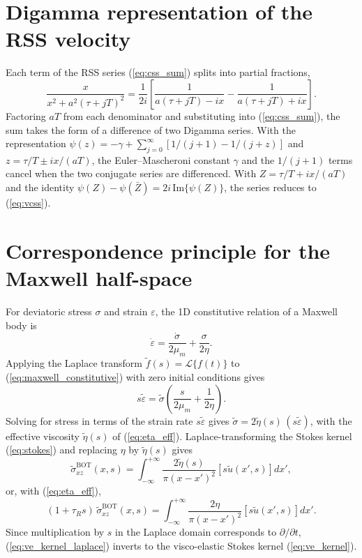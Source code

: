 \documentclass[extra]{gji}
\newcommand{\IM}{\mathrm{Im}}
\begin{document}
\section{Digamma representation of the RSS velocity}
\label{app:digamma}

Each term of the RSS series (\ref{eq:css_sum}) splits into partial
fractions,
\begin{equation*}
\frac{x}{x^2+a^2(\tau+jT)^2}
= \frac{1}{2i}\!\left[
    \frac{1}{a(\tau+jT)-ix} - \frac{1}{a(\tau+jT)+ix}
  \right].
\end{equation*}
Factoring $aT$ from each denominator and substituting into
(\ref{eq:css_sum}), the sum takes the form of a difference of two Digamma
series. With the representation $\psi(z) = -\gamma +
\sum_{j=0}^\infty[1/(j+1) - 1/(j+z)]$ and $z=\tau/T\pm ix/(aT)$, the
Euler--Mascheroni constant $\gamma$ and the $1/(j+1)$ terms cancel when the
two conjugate series are differenced. With $Z = \tau/T + ix/(aT)$ and the
identity $\psi(Z)-\psi(\bar{Z}) = 2i\,\IM\{\psi(Z)\}$, the series reduces to
(\ref{eq:vcss}).

\section{Correspondence principle for the Maxwell half-space}
\label{app:correspondence}

For deviatoric stress $\sigma$ and strain $\varepsilon$, the 1D
constitutive relation of a Maxwell body is
\begin{equation}
\dot{\varepsilon} = \frac{\dot{\sigma}}{2\mu_m} + \frac{\sigma}{2\eta}.
\label{eq:maxwell_constitutive}
\end{equation}
Applying the Laplace transform $\tilde{f}(s)=\mathcal{L}\{f(t)\}$ to
(\ref{eq:maxwell_constitutive}) with zero initial conditions gives
\begin{equation}
s\tilde{\varepsilon} = \tilde{\sigma}\!\left(\frac{s}{2\mu_m}+\frac{1}{2\eta}\right).
\label{eq:laplace_ve}
\end{equation}
Solving for stress in terms of the strain rate $s\tilde{\varepsilon}$ gives
$\tilde{\sigma} = 2\tilde{\eta}(s)\,(s\tilde{\varepsilon})$, with the effective
viscosity $\tilde{\eta}(s)$ of (\ref{eq:eta_eff}). Laplace-transforming the
Stokes kernel (\ref{eq:stokes}) and replacing $\eta$ by $\tilde{\eta}(s)$
gives
\[
\tilde{\sigma}_{xz}^{\text{BOT}}(x,s) =
  \int_{-\infty}^{+\infty}\frac{2\tilde{\eta}(s)}{\pi(x-x')^2}
  \left[s\tilde{u}(x',s)\right]dx',
\]
or, with (\ref{eq:eta_eff}),
\begin{equation}
(1+\tau_R s)\,\tilde{\sigma}_{xz}^{\text{BOT}}(x,s) =
  \int_{-\infty}^{+\infty}\frac{2\eta}{\pi(x-x')^2}
  \left[s\tilde{u}(x',s)\right]dx'.
\label{eq:ve_kernel_laplace}
\end{equation}
Since multiplication by $s$ in the Laplace domain corresponds to
$\partial/\partial t$, (\ref{eq:ve_kernel_laplace}) inverts to the
visco-elastic Stokes kernel (\ref{eq:ve_kernel}).
\end{document}

